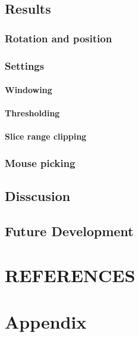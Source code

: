 \documentclass[twoside, english, 11pt]{report}
\begin{document}
\section{Results}
\subsection{Rotation and position}
\subsection{Settings}
\subsubsection{Windowing}
\subsubsection{Thresholding}
\subsubsection{Slice range clipping}
\subsection{Mouse picking}

\section{Disscusion}

\section{Future Development}

\chapter{REFERENCES}

\chapter{Appendix}
\end{document}
